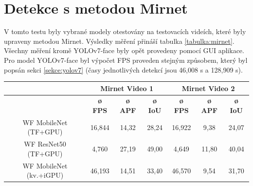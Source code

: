 \section{Detekce s metodou Mirnet}
\label{sekce:mirnetexperimenty}
V tomto testu byly vybrané modely otestovány na testovacích videích, které byly upraveny metodou Mirnet. Výsledky měření přináší tabulka \ref{tabulka:mirnet}. Všechny měření kromě YOLOv7-face byly opět provedeny pomocí GUI aplikace. Pro model YOLOv7-face byl výpočet FPS proveden stejným způsobem, který byl popsán sekci \ref{sekce:yolov7} (časy jednotlivých detekcí jsou 46,008 s a 128,909 s).

\begin{table}[H]
  \centering
  \begin{tabular}{c|ccc|ccc|}
  \cline{2-7}
                                                                             & \multicolumn{3}{c|}{\cellcolor[HTML]{CBCEFB}\textbf{Mirnet Video 1}}                                                                       & \multicolumn{3}{c|}{\cellcolor[HTML]{CBCEFB}\textbf{Mirnet Video 2}}                                                                       \\ \hline
  \rowcolor[HTML]{E0DBDB} 
  \multicolumn{1}{|c|}{\cellcolor[HTML]{E0DBDB}\textbf{Model}}               & \multicolumn{1}{c|}{\cellcolor[HTML]{E0DBDB}\textbf{ø FPS}} & \multicolumn{1}{c|}{\cellcolor[HTML]{E0DBDB}\textbf{ø APF}} & \textbf{ø IoU} & \multicolumn{1}{c|}{\cellcolor[HTML]{E0DBDB}\textbf{ø FPS}} & \multicolumn{1}{c|}{\cellcolor[HTML]{E0DBDB}\textbf{ø APF}} & \textbf{ø IoU} \\ \hline
  \multicolumn{1}{|c|}{\cellcolor[HTML]{E0DBDB}WF MobileNet (TF+GPU)}      & \multicolumn{1}{c|}{16,844}                                 & \multicolumn{1}{c|}{14,32}                                  & 28,24          & \multicolumn{1}{c|}{16,922}                                 & \multicolumn{1}{c|}{9,38}                                   & 24,07          \\ \hline
  \multicolumn{1}{|c|}{\cellcolor[HTML]{E0DBDB}WF ResNet50 (TF+GPU)}       & \multicolumn{1}{c|}{4,760}                                  & \multicolumn{1}{c|}{27,19}                                  & 49,00          & \multicolumn{1}{c|}{4,649}                                  & \multicolumn{1}{c|}{11,80}                                  & 40,04          \\ \hline
  \multicolumn{1}{|c|}{\cellcolor[HTML]{E0DBDB}WF MobileNet (kv.+iGPU)} & \multicolumn{1}{c|}{46,193}                                 & \multicolumn{1}{c|}{14,51}                                  & 33,40          & \multicolumn{1}{c|}{46,570}                                 & \multicolumn{1}{c|}{9,54}                                   & 31,70          \\ \hline

\end{tabular}
\end{table}
